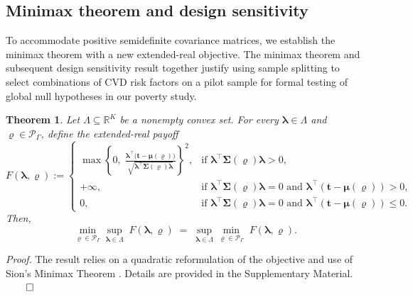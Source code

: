 \documentclass[12pt,leqno,titlepage]{amsart}
\newcommand{\1}{\mathbbm{1}}
\newtheorem{theorem}{Theorem}[]
\begin{document}
\begin{bibunit}
\subsection{Minimax theorem and design sensitivity} \label{sec: theory}





To accommodate positive semidefinite covariance matrices, we establish the minimax theorem with a new extended-real objective. The minimax theorem and subsequent design sensitivity result together justify using sample splitting to select combinations of CVD risk factors on a pilot sample for formal testing of global null hypotheses in our poverty study.


\begin{theorem} \label{minmax-thm}
Let $\Lambda \subseteq \mathbb R^K$ be a nonempty convex set. For every $\boldsymbol{\lambda} \in \Lambda$ and $\boldsymbol{\varrho} \in \mathcal{P}_{\Gamma}$, define the extended-real payoff
\[
F(\boldsymbol{\lambda},\boldsymbol{\varrho})
:=
\begin{cases}
\max
\left \{
0,\;
\frac{\boldsymbol{\lambda}^\top\bigl(\mathbf{t} - \boldsymbol{\mu}(\boldsymbol{\varrho})\bigr) }
{ \sqrt{\boldsymbol{\lambda}^\top \boldsymbol{
\Sigma}(\boldsymbol{\varrho})\boldsymbol{\lambda}} }
\right \}^2,
& \text{if } \boldsymbol{\lambda}^\top \boldsymbol{\Sigma}(\boldsymbol{\varrho})\boldsymbol{\lambda}>0,\\[2ex]
+\infty,
& \text{if } \boldsymbol{\lambda}^\top \boldsymbol{\Sigma}(\boldsymbol{\varrho})\boldsymbol{\lambda}=0
\text{ and } \boldsymbol{\lambda}^\top(\mathbf{t}-\boldsymbol{\mu}(\boldsymbol{\varrho}))>0,\\[1ex]
0,
& \text{if } \boldsymbol{\lambda}^\top \boldsymbol{\Sigma}(\boldsymbol{\varrho})\boldsymbol{\lambda}=0
\text{ and } \boldsymbol{\lambda}^\top(\mathbf{t}-\boldsymbol{\mu}(\boldsymbol{\varrho}))\le 0.
\end{cases}
\]
Then,
$$\min_{\boldsymbol{\varrho} \in \mathcal{P}_{\Gamma}} 
\sup_{\boldsymbol{\lambda} \in \Lambda} \;
F(\boldsymbol{\lambda},\boldsymbol{\varrho})
\;= \;
\sup_{\boldsymbol{\lambda} \in \Lambda} 
\min_{\boldsymbol{\varrho} \in \mathcal{P}_{\Gamma}} \;
F(\boldsymbol{\lambda},\boldsymbol{\varrho}).$$
\end{theorem}

\textit{Proof.} The result relies on a quadratic reformulation of the objective and use of Sion's Minimax Theorem \citep{sion1958general}. Details are provided in the Supplementary Material. \hfill $\qed$



\end{bibunit}
\end{document}
